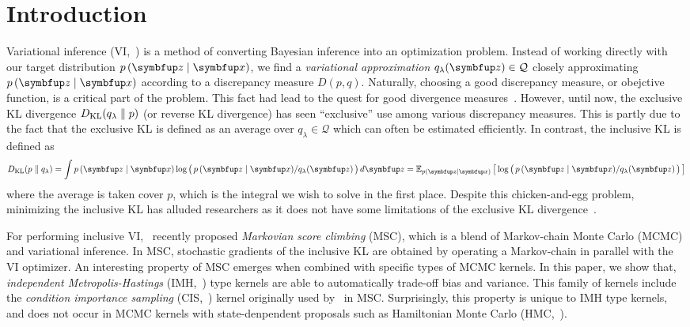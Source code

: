 
\section{Introduction}
Variational inference (VI,~\citealt{jordan_introduction_1999, blei_variational_2017}) is a method of converting Bayesian inference into an optimization problem.
Instead of working directly with our target distribution \(p\,(\vz\mid\vx)\), we find a \textit{variational approximation} \(q_{\lambda}(\vz) \in \mathcal{Q}\) closely approximating \(p\,(\vz\mid\vx)\) according to a discrepancy measure \(D(p, q)\).
Naturally, choosing a good discrepancy measure, or obejctive function, is a critical part of the problem.
This fact had lead to the quest for good divergence measures~\citep{NIPS2016_7750ca35, NIPS2017_35464c84, pmlr-v97-ruiz19a}.
However, until now, the exclusive KL divergence \(D_{\mathrm{KL}}(q_{\lambda}\parallel p)\) (or reverse KL divergence) has seen ``exclusive'' use among various discrepancy measures.
This is partly due to the fact that the exclusive KL is defined as an average over \(q_{\lambda} \in \mathcal{Q}\) which can often be estimated efficiently.
In contrast, the inclusive KL is defined as
%
\begin{align}
  \DKL{p}{q_{\lambda}} = \int p\,(\vz\mid\vx) \log\big(\, p\,(\vz\mid\vx)/q_{\lambda}(\vz) \,\big)\,d\vz
  = \Esub{p(\vz\mid\vx)}{\log\big(\, p\,(\vz\mid\vx)/q_{\lambda}(\vz) \,\big) } \label{eq:klpq}
\end{align}
%
where the average is taken cover \(p\), which is the integral we wish to solve in the first place.
Despite this chicken-and-egg problem, minimizing the inclusive KL has alluded researchers as it does not have some limitations of the exclusive KL divergence~\citep{minka2005divergence, mackay_local_2001}.

For performing inclusive VI,~\citet{NEURIPS2020_b2070693} recently proposed \textit{Markovian score climbing} (MSC), which is a blend of Markov-chain Monte Carlo (MCMC) and variational inference.
In MSC, stochastic gradients of the inclusive KL are obtained by operating a Markov-chain in parallel with the VI optimizer.
An interesting property of MSC emerges when combined with specific types of MCMC kernels.
In this paper, we show that, \textit{independent Metropolis-Hastings} (IMH,~\citealt{robert_monte_2004}) type kernels are able to automatically trade-off bias and variance.
This family of kernels include the \textit{condition importance sampling} (CIS,~\citealt{NEURIPS2020_b2070693}) kernel originally used by~\citeauthor{NEURIPS2020_b2070693} in MSC.
Surprisingly, this property is unique to IMH type kernels, and does not occur in MCMC kernels with state-denpendent proposals such as Hamiltonian Monte Carlo (HMC,~\citealt{duane_hybrid_1987, neal_mcmc_2011, betancourt_conceptual_2017}).

